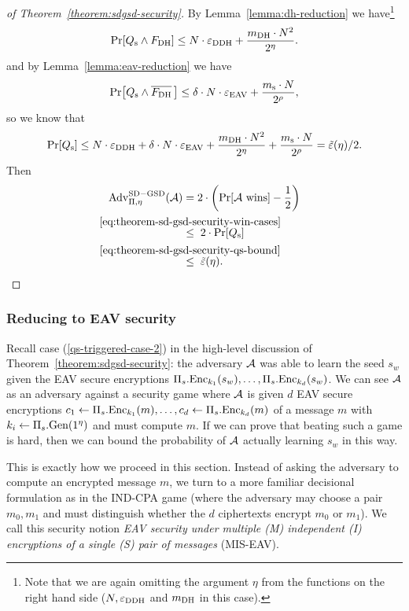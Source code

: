 \begin{proof}[of Theorem~\ref{theorem:sdgsd-security}]
	By Lemma~\vref{lemma:dh-reduction} we have\footnote{Note that we are again omitting the argument $\eta$ from the functions on the right hand side ($N, \varepsilon_\mathrm{DDH}$ and $m_\mathrm{DH}$ in this case).}
	\[
		\pr{\qs \land \fdh} \le N \cdot \eddh + \frac{\mdh \cdot N^2}{2^\eta}.
	\]
	and by Lemma~\vref{lemma:eav-reduction} we have
	\[
		\pr{\qs \land \overline{\fdh}\,} \le \delta \cdot N \cdot \eeav + \frac{\ms \cdot N}{2^\rho},
	\]
	so we know that
	\begin{equation} \label{eq:theorem-sd-gsd-security-qs-bound}
		\pr{\qs} \le N \cdot \eddh + \delta \cdot N \cdot \eeav + \frac{\mdh \cdot N^2}{2^\eta} + \frac{\ms \cdot N}{2^\rho} = \tilde{\epsilon}(\eta) / 2.
	\end{equation}
	Then
	\begin{align*}
		\advantage{\Pi}{\eta}{SD-GSD}(\adv) & = 2 \cdot \left(\pr{\wins} - \frac{1}{2}\right)                                                   \\
		                                    & \stackrel{\mathclap{\eqref{eq:theorem-sd-gsd-security-win-cases}}}{\le} \;  2 \cdot \pr{\qs}      \\
		                                    & \stackrel{\mathclap{\eqref{eq:theorem-sd-gsd-security-qs-bound}}}{\le} \; \tilde{\epsilon}(\eta).
	\end{align*}
\end{proof}

\subsubsection{Reducing to EAV security}

Recall case (\ref{qs-triggered-case-2}) in the high-level discussion of Theorem~\ref{theorem:sdgsd-security}: the adversary $\mathcal{A}$ was able to learn the seed $s_w$ given the EAV secure encryptions $\Pi_s.\mathrm{Enc}_{k_1}(s_w), \ldots, \Pi_s.\mathrm{Enc}_{k_d}(s_w)$. We can see $\mathcal{A}$ as an adversary against a security game where $\mathcal{A}$ is given $d$ EAV secure encryptions $c_1 \leftarrow \Pi_s.\mathrm{Enc}_{k_1}(m), \ldots, c_d \leftarrow \Pi_s.\mathrm{Enc}_{k_d}(m)$ of a message $m$ with $k_i \leftarrow \Pi_s.\mathrm{Gen}(1^\eta)$ and must compute $m$. If we can prove that beating such a game is hard, then we can bound the probability of $\mathcal{A}$ actually learning $s_w$ in this way.

This is exactly how we proceed in this section. Instead of asking the adversary to compute an encrypted message $m$, we turn to a more familiar decisional formulation as in the IND-CPA game (where the adversary may choose a pair $m_0, m_1$ and must distinguish whether the $d$ ciphertexts encrypt $m_0$ or $m_1$). We call this security notion \emph{EAV security under multiple (M) independent (I) encryptions of a single (S) pair of messages} (MIS-EAV).

